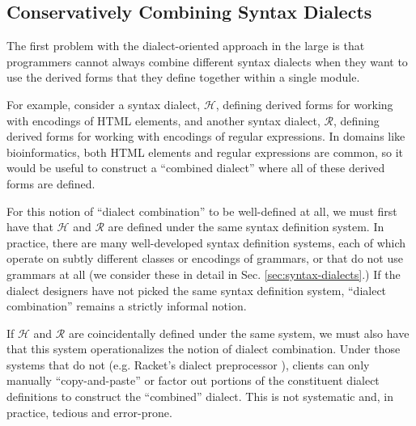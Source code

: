 \subsection{Conservatively Combining Syntax Dialects}
The first problem with the dialect-oriented approach in the large is that programmers cannot always combine different syntax dialects when they want to use the derived forms that they define together within a single module.

For example, consider a syntax dialect, $\mathcal{H}$, defining derived forms for working with encodings of HTML elements, and another syntax dialect, $\mathcal{R}$,  defining derived forms for working with encodings of regular expressions. In domains like bioinformatics, both HTML elements and regular expressions are common, so it would be useful to construct a ``combined dialect'' where all of these derived forms are defined. 

For this notion of ``dialect combination'' to be well-defined at all, we must first have that $\mathcal{H}$ and $\mathcal{R}$ are defined under the same syntax definition system. In practice, there are many well-developed syntax definition systems, each of which operate on subtly different classes or encodings of grammars, or that do not use grammars at all (we consider these in detail in Sec. \ref{sec:syntax-dialects}.) If the dialect designers  have not  picked the same syntax definition system, ``dialect combination'' remains a strictly informal notion.%

If $\mathcal{H}$ and $\mathcal{R}$ are coincidentally defined under the same system, we must also have that this system operationalizes the notion of dialect combination. Under those systems that do not (e.g. Racket's dialect preprocessor \cite{Flatt:2012:CLR:2063176.2063195}), clients can only manually  ``copy-and-paste'' or factor out portions of the constituent dialect definitions to construct the ``combined'' dialect. This is not systematic and, in practice, tedious and error-prone.%

